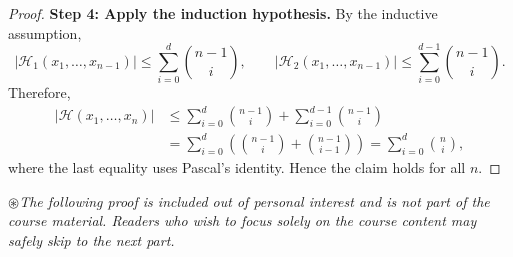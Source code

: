 \documentclass[../main]{subfiles}
\begin{document}
\begin{proof}
    \textbf{Step 4: Apply the induction hypothesis.}
    By the inductive assumption,
    \begin{equation}
        |\mathcal{H}_1(x_1,\dots,x_{n-1})| \le \sum_{i=0}^{d} \binom{n-1}{i},
        \qquad
        |\mathcal{H}_2(x_1,\dots,x_{n-1})| \le \sum_{i=0}^{d-1} \binom{n-1}{i}.
    \end{equation}
    Therefore,
    \begin{align}
        |\mathcal{H}(x_1,\dots,x_n)|
        &\le \sum_{i=0}^{d} \binom{n-1}{i}
           + \sum_{i=0}^{d-1} \binom{n-1}{i} \\
        &= \sum_{i=0}^{d} \left( \binom{n-1}{i} + \binom{n-1}{i-1} \right)
           = \sum_{i=0}^{d} \binom{n}{i},
    \end{align}
    where the last equality uses Pascal's identity.  
    Hence the claim holds for all $n$.
    \end{proof}
    \begin{tcolorbox}
        \vspace{0.5em}
            \color{red!50!black}$\circledast   $\quad\emph{{The following proof is included out of personal interest and is not part of the course material. 
            Readers who wish to focus solely on the course content may safely skip to the next part.}}
        \vspace{0.5em}
    \end{tcolorbox}
\end{document}
